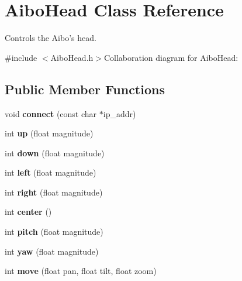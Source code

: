 \hypertarget{classAiboHead}{
\section{AiboHead Class Reference}
\label{classAiboHead}
}


Controls the Aibo's head.  


{\ttfamily \#include $<$AiboHead.h$>$}Collaboration diagram for AiboHead:\subsection*{Public Member Functions}
\begin{DoxyCompactItemize}
\item 
\hypertarget{classAiboHead_a5fef344c99e421b7c704099628ca3542}{
void {\bfseries connect} (const char $\ast$ip\_\-addr)}
\label{classAiboHead_a5fef344c99e421b7c704099628ca3542}

\item 
\hypertarget{classAiboHead_a085f54c6374d5eb117c12b0e9cad2d0e}{
int {\bfseries up} (float magnitude)}
\label{classAiboHead_a085f54c6374d5eb117c12b0e9cad2d0e}

\item 
\hypertarget{classAiboHead_a60bd059ca7a58ee2b3ee95011150ea89}{
int {\bfseries down} (float magnitude)}
\label{classAiboHead_a60bd059ca7a58ee2b3ee95011150ea89}

\item 
\hypertarget{classAiboHead_a4821a0ccff77b881636aec49703a3683}{
int {\bfseries left} (float magnitude)}
\label{classAiboHead_a4821a0ccff77b881636aec49703a3683}

\item 
\hypertarget{classAiboHead_a6be7b6743be53896c2f41dc1db1ce2a5}{
int {\bfseries right} (float magnitude)}
\label{classAiboHead_a6be7b6743be53896c2f41dc1db1ce2a5}

\item 
\hypertarget{classAiboHead_a2e754379dcba417ebd438c40b437db76}{
int {\bfseries center} ()}
\label{classAiboHead_a2e754379dcba417ebd438c40b437db76}

\item 
\hypertarget{classAiboHead_a8a1c455d24761b2946b796150ff2fd67}{
int {\bfseries pitch} (float magnitude)}
\label{classAiboHead_a8a1c455d24761b2946b796150ff2fd67}

\item 
\hypertarget{classAiboHead_aa22c906d22cb79780d47b7ac3730dee4}{
int {\bfseries yaw} (float magnitude)}
\label{classAiboHead_aa22c906d22cb79780d47b7ac3730dee4}

\item 
\hypertarget{classAiboHead_adf0f91fafeaa5e32b5e387ac136e0f37}{
int {\bfseries move} (float pan, float tilt, float zoom)}
\label{classAiboHead_adf0f91fafeaa5e32b5e387ac136e0f37}

\end{DoxyCompactItemize}


